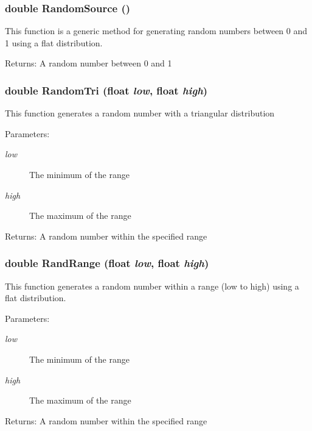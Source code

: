 \subsubsection{\setlength{\rightskip}{0pt plus 5cm}double Random\-Source ()}\label{utility_8h_a32}


This function is a generic method for generating random numbers between 0 and 1 using a flat distribution. \begin{Desc}
\item[Returns:]A random number between 0 and 1 \end{Desc}
\subsubsection{\setlength{\rightskip}{0pt plus 5cm}double Random\-Tri (float {\em low}, float {\em high})}\label{utility_8h_a34}


This function generates a random number with a triangular distribution \begin{Desc}
\item[Parameters:]
\begin{description}
\item[{\em low}]The minimum of the range \item[{\em high}]The maximum of the range \end{description}
\end{Desc}
\begin{Desc}
\item[Returns:]A random number within the specified range \end{Desc}
\subsubsection{\setlength{\rightskip}{0pt plus 5cm}double Rand\-Range (float {\em low}, float {\em high})}\label{utility_8h_a33}


This function generates a random number within a range (low to high) using a flat distribution. \begin{Desc}
\item[Parameters:]
\begin{description}
\item[{\em low}]The minimum of the range \item[{\em high}]The maximum of the range \end{description}
\end{Desc}
\begin{Desc}
\item[Returns:]A random number within the specified range \end{Desc}
